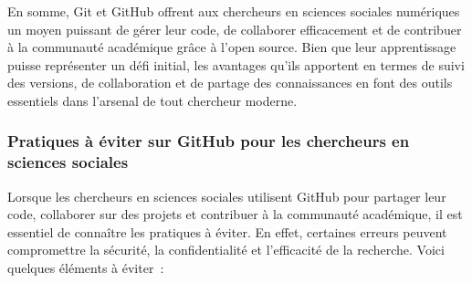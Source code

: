 \documentclass[
  letterpaper,
  DIV=11,
  numbers=noendperiod]{scrreprt}
\begin{document}
En somme, Git et GitHub offrent aux chercheurs en sciences sociales
numériques un moyen puissant de gérer leur code, de collaborer
efficacement et de contribuer à la communauté académique grâce à l'open
source. Bien que leur apprentissage puisse représenter un défi initial,
les avantages qu'ils apportent en termes de suivi des versions, de
collaboration et de partage des connaissances en font des outils
essentiels dans l'arsenal de tout chercheur moderne.

\subsubsection{Pratiques à éviter sur GitHub pour les chercheurs en
sciences
sociales}\label{pratiques-uxe0-uxe9viter-sur-github-pour-les-chercheurs-en-sciences-sociales}

Lorsque les chercheurs en sciences sociales utilisent GitHub pour
partager leur code, collaborer sur des projets et contribuer à la
communauté académique, il est essentiel de connaître les pratiques à
éviter. En effet, certaines erreurs peuvent compromettre la sécurité, la
confidentialité et l'efficacité de la recherche. Voici quelques éléments
à éviter~:
\end{document}
